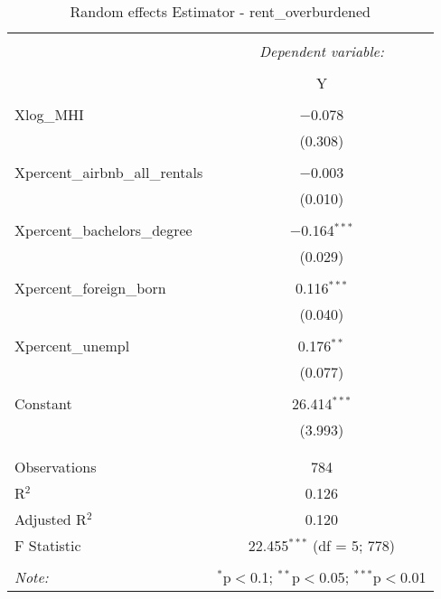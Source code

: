 \documentclass{article}
\begin{document}
\begin{table}[!htbp] \centering 
  \caption{Random effects Estimator - rent\_overburdened} 
  \label{} 
  \begin{tabular}{@{\extracolsep{5pt}}lc} 
    \\[-1.8ex]\hline 
    \hline \\[-1.8ex] 
    & \multicolumn{1}{c}{\textit{Dependent variable:}} \\ 
    \cline{2-2} 
    \\[-1.8ex] & Y \\ 
    \hline \\[-1.8ex] 
    Xlog\_MHI & $-$0.078 \\ 
    & (0.308) \\ 
    & \\ 
    Xpercent\_airbnb\_all\_rentals & $-$0.003 \\ 
    & (0.010) \\ 
    & \\ 
    Xpercent\_bachelors\_degree & $-$0.164$^{***}$ \\ 
    & (0.029) \\ 
    & \\ 
    Xpercent\_foreign\_born & 0.116$^{***}$ \\ 
    & (0.040) \\ 
    & \\ 
    Xpercent\_unempl & 0.176$^{**}$ \\ 
    & (0.077) \\ 
    & \\ 
    Constant & 26.414$^{***}$ \\ 
    & (3.993) \\ 
    & \\ 
    \hline \\[-1.8ex] 
    Observations & 784 \\ 
    R$^{2}$ & 0.126 \\ 
    Adjusted R$^{2}$ & 0.120 \\ 
    F Statistic & 22.455$^{***}$ (df = 5; 778) \\ 
    \hline 
    \hline \\[-1.8ex] 
    \textit{Note:}  & \multicolumn{1}{r}{$^{*}$p$<$0.1; $^{**}$p$<$0.05; $^{***}$p$<$0.01} \\ 
  \end{tabular} 
\end{table} 
\end{document}
